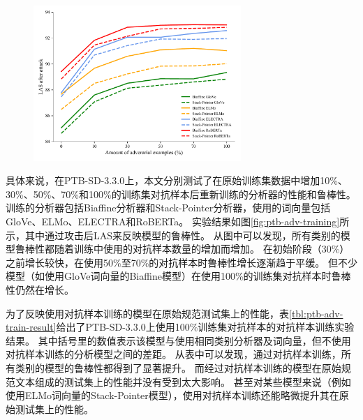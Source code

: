 \begin{figure}[hbtp]
	\centering
	\includegraphics[width=0.7\textwidth]{figures/adv_training_after_attack.pdf}
\end{figure}

具体来说，在PTB-SD-3.3.0上，本文分别测试了在原始训练集数据中增加10\%、30\%、50\%、70\%和100\%的训练集对抗样本后重新训练的分析器的性能和鲁棒性。
训练的分析器包括Biaffine分析器和Stack-Pointer分析器，使用的词向量包括GloVe、ELMo、ELECTRA和RoBERTa。
实验结果如图\ref{fig:ptb-adv-training}所示，其中通过攻击后LAS来反映模型的鲁棒性。
从图中可以发现，所有类别的模型鲁棒性都随着训练中使用的对抗样本数量的增加而增加。
在初始阶段（30\%）之前增长较快，在使用50\%至70\%的对抗样本时鲁棒性增长逐渐趋于平缓。
但不少模型（如使用GloVe词向量的Biaffine模型）在使用100\%的训练集对抗样本时鲁棒性仍然在增长。

为了反映使用对抗样本训练的模型在原始规范测试集上的性能，表\ref{tbl:ptb-adv-train-result}给出了PTB-SD-3.3.0上使用100\%训练集对抗样本的对抗样本训练实验结果。
其中括号里的数值表示该模型与使用相同类别分析器及词向量，但不使用对抗样本训练的分析模型之间的差距。
从表中可以发现，通过对抗样本训练，所有类别的模型的鲁棒性都得到了显著提升。
而经过对抗样本训练的模型在原始规范文本组成的测试集上的性能并没有受到太大影响。
甚至对某些模型来说（例如使用ELMo词向量的Stack-Pointer模型），使用对抗样本训练还能略微提升其在原始测试集上的性能。

